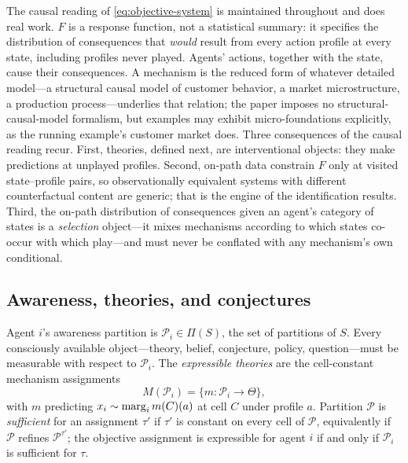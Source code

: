 The causal reading of \cref{eq:objective-system} is maintained throughout and
does real work.  $F$ is a response function, not a statistical summary: it
specifies the distribution of consequences that \emph{would} result from
every action profile at every state, including profiles never played.
Agents' actions, together with the state, cause their consequences.  A
mechanism is the reduced form of whatever detailed model---a structural
causal model of customer behavior, a market microstructure, a production
process---underlies that relation; the paper imposes no structural-causal-model
formalism, but examples may exhibit micro-foundations explicitly, as the
running example's customer market does.  Three consequences of the causal
reading recur.  First, theories, defined next, are interventional objects:
they make predictions at unplayed profiles.  Second, on-path data constrain
$F$ only at visited state--profile pairs, so observationally equivalent
systems with different counterfactual content are generic; that is the engine
of the identification results.  Third, the on-path distribution of
consequences given an agent's category of states is a \emph{selection}
object---it mixes mechanisms according to which states co-occur with which
play---and must never be conflated with any mechanism's own conditional.

\subsection{Awareness, theories, and conjectures}
\label{sec:awareness-sub}

\begin{definition}
\label{def:awareness}
Agent $i$'s awareness partition is $\mathcal P_i\in\Pi(S)$, the set of
partitions of $S$.  Every consciously available object---theory, belief,
conjecture, policy, question---must be measurable with respect to
$\mathcal P_i$.  The \emph{expressible theories} are the cell-constant
mechanism assignments
\begin{equation}
M(\mathcal P_i)=\{m:\mathcal P_i\to\Theta\},
\label{eq:expressible}
\end{equation}
with $m$ predicting $x_i\sim\operatorname{marg}_{i}m(C)(a)$ at cell $C$ under profile $a$.
Partition $\mathcal P$ is \emph{sufficient} for an assignment $\tau'$ if
$\tau'$ is constant on every cell of $\mathcal P$, equivalently if $\mathcal
P$ refines $\mathcal P^{\tau'}$; the objective assignment is expressible for
agent $i$ if and only if $\mathcal P_i$ is sufficient for $\tau$.
\end{definition}

